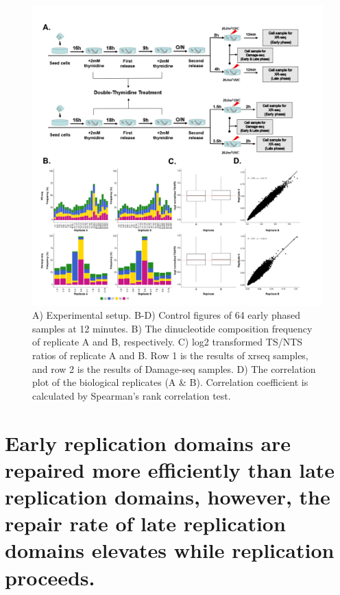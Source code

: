 \shorthandoff{=}
\begin{figure}[H]
    \begin{center}
    \includegraphics[width=\textwidth]{Chapters/4_results/figures/fig1}
    \caption[Experimental setup.]{A) Experimental setup. B-D) Control figures of \gls{64} early phased samples at 12 minutes. B) The dinucleotide composition frequency of replicate A and B, respectively. C) log2 transformed TS/NTS ratios of replicate A and B. Row 1 is the results of \gls{xrseq} samples, and row 2 is the results of Damage-seq samples. D) The correlation plot of the biological replicates (A \& B). Correlation coefficient is calculated by Spearman’s rank correlation test.}
    \label{fig:intro}
    \end{center}
    \end{figure}


\section{Early replication domains are repaired more efficiently than late replication domains, however, the repair rate of late replication domains elevates while replication proceeds.}

